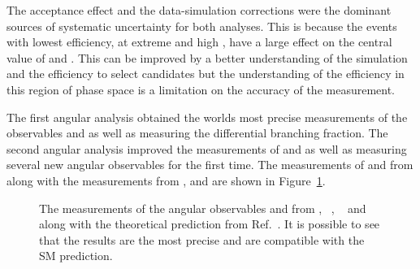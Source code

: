 The acceptance effect and the data-simulation corrections were the dominant sources of systematic uncertainty for both analyses. 
This is because the events with lowest efficiency, at extreme \ctl and high \ctk, have a large effect on the central value of \AFB and \FL.
This can be improved by a better understanding of the simulation and the efficiency to select \BdToKstmm candidates
 but the understanding of the efficiency in this region of phase space is a limitation on the accuracy of the measurement.

The first angular analysis obtained the worlds most precise measurements of the observables \AFB and \FL as well as measuring the differential branching fraction.
The second angular analysis improved the measurements of \AFB and \FL 
as well as measuring several new angular observables for the first time.
The measurements of \AFB and \FL from \lhcb along with the measurements from \babar, \belle and \cdf are shown in Figure~\ref{fig:res:comboexp}.
\begin{figure}[tbp]
\centering
{}
\caption{The measurements of the angular observables \FL and \AFB from \lhcb, \babar~\cite{Aubert:2007hz,Aubert:2008ju}, 
\belle~\cite{PhysRevLett.103.171801}  and \cdf~\cite{Aaltonen:2011cn,Aaltonen:2011ja} along with the theoretical prediction from Ref.~\cite{Bobeth:2011gi}. 
It is possible to see that the \lhcb results are the most precise and are compatible with the SM prediction.~\label{fig:res:comboexp}}
\end{figure}

